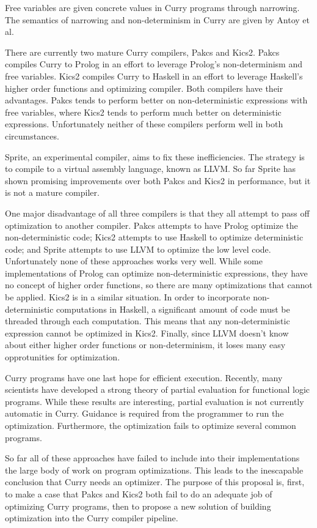 Free variables are given concrete values in Curry programs through narrowing.
The semantics of narrowing and non-determinism in Curry are given by Antoy et al. \cite{Antoy97ALP}

There are currently two mature Curry compilers, Pakcs and Kics2.
Pakcs compiles Curry to Prolog in an effort to leverage Prolog's non-determinism and free variables.
Kics2 compiles Curry to Haskell in an effort to leverage Haskell's higher order functions and optimizing compiler.
Both compilers have their advantages.  Pakcs tends to perform better on non-deterministic expressions with free variables,
where Kics2 tends to perform much better on deterministic expressions.
Unfortunately neither of these compilers perform well in both circumstances.

Sprite, an experimental compiler, aims to fix these inefficiencies.
The strategy is to compile to a virtual assembly language, known as LLVM.
So far Sprite has shown promising improvements over both Pakcs and Kics2 in performance,
but it is not a mature compiler.

One major disadvantage of all three compilers is that they all attempt to pass off optimization to another compiler.
Pakcs attempts to have Prolog optimize the non-deterministic code; Kics2 attempts to use Haskell to optimize
deterministic code; and Sprite attempts to use LLVM to optimize the low level code.
Unfortunately none of these approaches works very well.
While some implementations of Prolog can optimize non-deterministic expressions, they have no concept of higher order functions,
so there are many optimizations that cannot be applied.
Kics2 is in a similar situation.  
In order to incorporate non-deterministic computations in Haskell, 
a significant amount of code must be threaded through each computation.
This means that any non-deterministic expression cannot be optimized in Kics2.
Finally, since LLVM doesn't know about either higher order functions or non-determinism, it loses many easy opprotunities for optimization.

Curry programs have one last hope for efficient execution.
Recently, many scientists \cite{peval_bjorn, offline_peval_Ramos} 
have developed a strong theory of partial evaluation for functional logic programs.
While these results are interesting, partial evaluation is not currently automatic in Curry.
Guidance is required from the programmer to run the optimization.
Furthermore, the optimization fails to optimize several common programs.

So far all of these approaches have failed to include into their implementations the large body of work on program optimizations.
This leads to the inescapable conclusion that Curry needs an optimizer.
The purpose of this proposal is, first, to make a case that Pakcs and Kics2 both fail to do an adequate job
of optimizing Curry programs, then to propose a new solution of building optimization into the Curry compiler pipeline.

